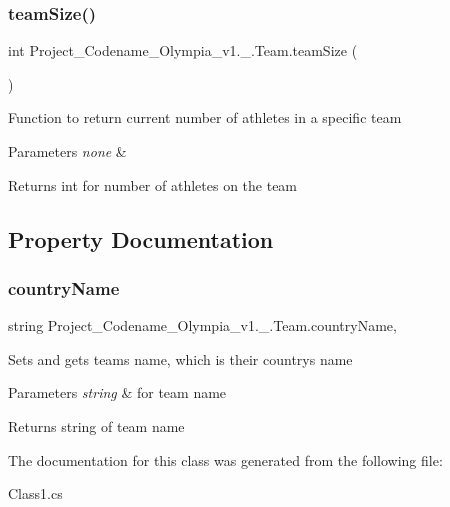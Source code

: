 \subsubsection{\texorpdfstring{team\+Size()}{teamSize()}}
{\footnotesize\ttfamily int Project\+\_\+\+Codename\+\_\+\+Olympia\+\_\+v1.\+\_.\+Team.\+team\+Size (\begin{DoxyParamCaption}{ }\end{DoxyParamCaption})\hspace{0.3cm}{\ttfamily [inline]}}

Function to return current number of athletes in a specific team 
\begin{DoxyParams}{Parameters}
{\em none} & \\
\hline
\end{DoxyParams}
\begin{DoxyReturn}{Returns}
int for number of athletes on the team 
\end{DoxyReturn}


\subsection{Property Documentation}
\mbox{\label{classProject__Codename__Olympia__v1_1_1__0_1_1Team_ae9c37c693f3d3254986cbea43819c946}} 
\subsubsection{\texorpdfstring{country\+Name}{countryName}}
{\footnotesize\ttfamily string Project\+\_\+\+Codename\+\_\+\+Olympia\+\_\+v1.\+\_.\+Team.\+country\+Name\hspace{0.3cm}{\ttfamily [get]}, {\ttfamily [set]}}

Sets and gets team\textquotesingle{}s name, which is their country\textquotesingle{}s name 
\begin{DoxyParams}{Parameters}
{\em string} & for team name \\
\hline
\end{DoxyParams}
\begin{DoxyReturn}{Returns}
string of team name 
\end{DoxyReturn}


The documentation for this class was generated from the following file\+:\begin{DoxyCompactItemize}
\item 
Class1.\+cs\end{DoxyCompactItemize}

